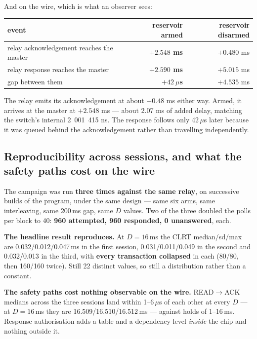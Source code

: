 \documentclass[10pt,a4paper,oneside]{article}
\newcommand{\num}[1]{\mbox{#1}}
\begin{document}
And on the wire, which is what an observer sees:

\begin{center}
\begin{tabular}{lrr}
\toprule
\textbf{event} & \textbf{reservoir armed} & \textbf{reservoir disarmed} \\
\midrule
relay acknowledgement reaches the master & \textbf{$+\num{2.548}$ ms} & $+\num{0.480}$ ms \\
relay response reaches the master        & \textbf{$+\num{2.590}$ ms} & $+\num{5.015}$ ms \\
gap between them                         & \textbf{$+42\ \mu$s}       & $+\num{4.535}$ ms \\
\bottomrule
\end{tabular}
\end{center}

The relay emits its acknowledgement at about $+\num{0.48}$ ms either way. Armed, it arrives
at the master at $+\num{2.548}$ ms --- about \num{2.07} ms of added delay, matching the
switch's internal \num{2 001 415} ns. The response follows only 42\,$\mu$s later because it
was queued behind the acknowledgement rather than travelling independently.

\subsection{Reproducibility across sessions, and what the safety paths cost on the wire}

The campaign was run \textbf{three times against the same relay}, on successive builds of the
program, under the same design --- same six arms, same interleaving, same 200\,ms gap, same
$D$ values. Two of the three doubled the polls per block to 40: \textbf{960 attempted, 960
responded, 0 unanswered}, each.

\textbf{The headline result reproduces.} At $D=16$\,ms the CLRT median/sd/max are
\num{0.032}/\num{0.012}/\num{0.047}\,ms in the first session,
\num{0.031}/\num{0.011}/\num{0.049} in the second and \num{0.032}/\num{0.013} in the third,
with \textbf{every transaction collapsed} in each (80/80, then 160/160 twice). Still 22
distinct values, so still a distribution rather than a constant.

\textbf{The safety paths cost nothing observable on the wire.} READ$\to$ACK medians across
the three sessions land within 1--6\,$\mu$s of each other at every $D$ --- at $D=16$\,ms they
are \num{16.509}/\num{16.510}/\num{16.512}\,ms --- against holds of 1--16\,ms. Response
authorisation adds a table and a dependency level \emph{inside} the chip and nothing outside
it.
\end{document}
